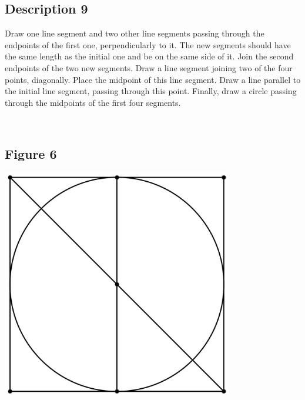 \documentclass[12pt,a4paper,article,english,firamath]{nsi}
\begin{document}
\maketitle

\subsection*{Description 9}
{\brettley 

Draw one line segment and two other line segments passing through the endpoints of the first one, perpendicularly to it. The new segments should have the same length as the initial one and be on the same side of it. Join the second endpoints of the two new segments. Draw a line segment joining two of the four points, diagonally. Place the midpoint of this line segment. Draw a line parallel to the initial line segment, passing through this point. Finally, draw a circle passing through the midpoints of the first four segments.}\\[1em]



\subsection*{Figure 6}
\begin{center}
    \includegraphics[height=10cm]{img/fig09.png}
\end{center}
\end{document}
